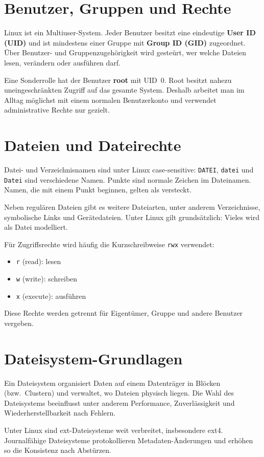 \documentclass[11pt, oneside, numbers=nönddot]{scrbook}
\begin{document}
\section{Benutzer, Gruppen und Rechte}
Linux ist ein Multiuser-System. Jeder Benutzer besitzt eine eindeutige \textbf{User ID (UID)} und ist mindestens einer Gruppe mit \textbf{Group ID (GID)} zugeordnet. Über Benutzer- und Gruppenzugehörigkeit wird gesteürt, wer welche Dateien lesen, verändern oder ausführen darf.

Eine Sonderrolle hat der Benutzer \textbf{root} mit UID~0. Root besitzt nahezu uneingeschränkten Zugriff auf das gesamte System. Deshalb arbeitet man im Alltag möglichst mit einem normalen Benutzerkonto und verwendet administrative Rechte nur gezielt.

\section{Dateien und Dateirechte}
Datei- und Verzeichnisnamen sind unter Linux case-sensitive: \texttt{DATEI}, \texttt{datei} und \texttt{Datei} sind verschiedene Namen. Punkte sind normale Zeichen im Dateinamen. Namen, die mit einem Punkt beginnen, gelten als versteckt.

Neben regulären Dateien gibt es weitere Dateiarten, unter anderem Verzeichnisse, symbolische Links und Gerätedateien. Unter Linux gilt grundsätzlich: Vieles wird als Datei modelliert.

Für Zugriffsrechte wird häufig die Kurzschreibweise \texttt{rwx} verwendet:
\begin{itemize}
\item \texttt{r} (read): lesen
\item \texttt{w} (write): schreiben
\item \texttt{x} (execute): ausführen
\end{itemize}
Diese Rechte werden getrennt für Eigentümer, Gruppe und andere Benutzer vergeben.

\section{Dateisystem-Grundlagen}
Ein Dateisystem organisiert Daten auf einem Datenträger in Blöcken (bzw.\ Clustern) und verwaltet, wo Dateien physisch liegen. Die Wahl des Dateisystems beeinflusst unter anderem Performance, Zuverlässigkeit und Wiederherstellbarkeit nach Fehlern.

Unter Linux sind ext-Dateisysteme weit verbreitet, insbesondere ext4. Journalfähige Dateisysteme protokollieren Metadaten-Änderungen und erhöhen so die Konsistenz nach Abstürzen.
\end{document}
